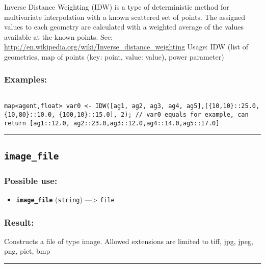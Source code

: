 \documentclass[]{book}
\providecommand{\tightlist}{%
  \setlength{\itemsep}{0pt}\setlength{\parskip}{0pt}}
\theoremstyle{definition}
\theoremstyle{definition}
\theoremstyle{definition}
\theoremstyle{remark}
\begin{document}
Inverse Distance Weighting (IDW) is a type of deterministic method for
multivariate interpolation with a known scattered set of points. The
assigned values to each geometry are calculated with a weighted average
of the values available at the known points. See:
\url{http://en.wikipedia.org/wiki/Inverse_distance_weighting} Usage: IDW
(list of geometries, map of points (key: point, value: value), power
parameter)

\subsubsection{Examples:}\label{examples-202}

\begin{verbatim}
 
map<agent,float> var0 <- IDW([ag1, ag2, ag3, ag4, ag5],[{10,10}::25.0, {10,80}::10.0, {100,10}::15.0], 2); // var0 equals for example, can return [ag1::12.0, ag2::23.0,ag3::12.0,ag4::14.0,ag5::17.0]
\end{verbatim}

\begin{center}\rule{0.5\linewidth}{\linethickness}\end{center}

\subsection{\texorpdfstring{\texttt{image\_file}}{image\_file}}\label{image_file}

\subsubsection{Possible use:}\label{possible-use-264}

\begin{itemize}
\tightlist
\item
  \textbf{\texttt{image\_file}} (\texttt{string}) ---\textgreater{}
  \texttt{file}
\end{itemize}

\subsubsection{Result:}\label{result-254}

Constructs a file of type image. Allowed extensions are limited to tiff,
jpg, jpeg, png, pict, bmp

\begin{center}\rule{0.5\linewidth}{\linethickness}\end{center}
\end{document}
